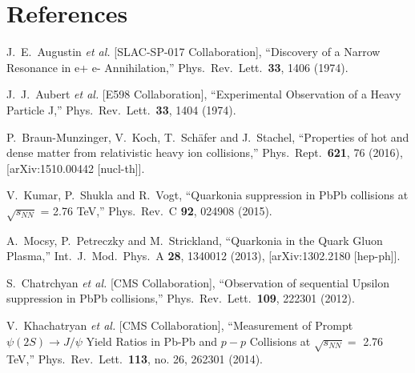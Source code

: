 \documentclass[12pt,a4paper,final]{iopart}
\begin{document}
\section*{References}
\begin{thebibliography}{100}

  J.~E.~Augustin {\it et al.} [SLAC-SP-017 Collaboration],
  ``Discovery of a Narrow Resonance in e+ e- Annihilation,''
  Phys.\ Rev.\ Lett.\  {\bf 33}, 1406 (1974).

  J.~J.~Aubert {\it et al.} [E598 Collaboration],
  ``Experimental Observation of a Heavy Particle J,''
  Phys.\ Rev.\ Lett.\  {\bf 33}, 1404 (1974).
  

  P.~Braun-Munzinger, V.~Koch, T.~Schäfer and J.~Stachel,
  ``Properties of hot and dense matter from relativistic heavy ion collisions,''
  Phys.\ Rept.\  {\bf 621}, 76 (2016),
  [arXiv:1510.00442 [nucl-th]].
  




  V.~Kumar, P.~Shukla and R.~Vogt,
  ``Quarkonia suppression in PbPb collisions at $\sqrt{s_{NN}}$ = 2.76 TeV,''
  Phys.\ Rev.\ C {\bf 92}, 024908 (2015).



%
  A.~Mocsy, P.~Petreczky and M.~Strickland,
  ``Quarkonia in the Quark Gluon Plasma,''
  Int.\ J.\ Mod.\ Phys.\ A {\bf 28}, 1340012 (2013),
  [arXiv:1302.2180 [hep-ph]].



  S.~Chatrchyan {\it et al.} [CMS Collaboration],
  ``Observation of sequential Upsilon suppression in PbPb collisions,''
  Phys.\ Rev.\ Lett.\  {\bf 109}, 222301 (2012).


  V.~Khachatryan {\it et al.} [CMS Collaboration],
  ``Measurement of Prompt $\psi(2S) \to J/\psi$ Yield Ratios in Pb-Pb and $p-p$ Collisions at $\sqrt {s_{NN}}=$ 2.76  TeV,''
  Phys.\ Rev.\ Lett.\  {\bf 113}, no. 26, 262301 (2014).



\end{thebibliography}
\end{document}
